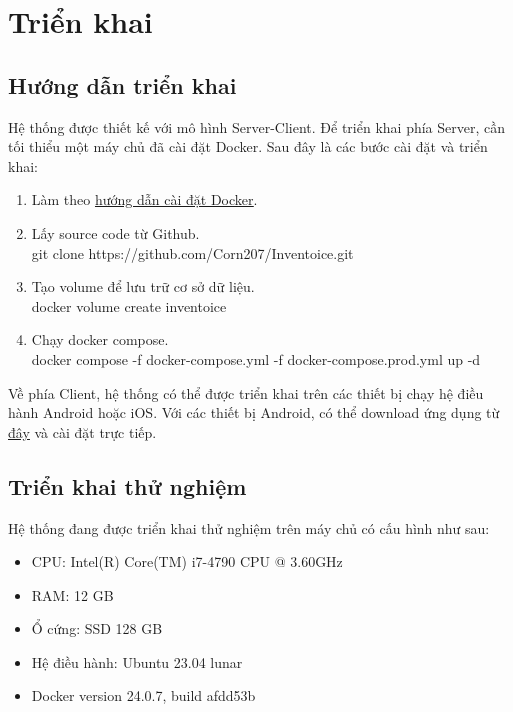\documentclass[../DoAn.tex]{subfiles}
\begin{document}
\section{Triển khai}
\label{section:deployment}

\subsection{Hướng dẫn triển khai}
\label{subsection:deployment-guide}
Hệ thống được thiết kế với mô hình Server-Client. Để triển khai phía Server, cần tối thiểu một máy chủ đã cài đặt Docker. Sau đây là các bước cài đặt và triển khai:
\begin{enumerate}
    \item Làm theo \href{https://docs.docker.com/engine/install/}{\color{blue}\underline{hướng dẫn cài đặt Docker}}.
    \item Lấy source code từ Github. \\
          git clone https://github.com/Corn207/Inventoice.git
    \item Tạo volume để lưu trữ cơ sở dữ liệu. \\
          docker volume create inventoice
    \item Chạy docker compose. \\
          docker compose -f docker-compose.yml -f docker-compose.prod.yml up -d
\end{enumerate}
Về phía Client, hệ thống có thể được triển khai trên các thiết bị chạy hệ điều hành Android hoặc iOS. Với các thiết bị Android, có thể download ứng dụng từ \href{https://github.com/Corn207/Inventoice/releases}{\color{blue}\underline{đây}} và cài đặt trực tiếp.


\subsection{Triển khai thử nghiệm}
\label{subsection:deployment-testing}
Hệ thống đang được triển khai thử nghiệm trên máy chủ có cấu hình như sau:
\begin{itemize}
    \item CPU: Intel(R) Core(TM) i7-4790 CPU @ 3.60GHz
    \item RAM: 12 GB
    \item Ổ cứng: SSD 128 GB
    \item Hệ điều hành: Ubuntu 23.04 lunar
    \item Docker version 24.0.7, build afdd53b
\end{itemize}
\end{document}

